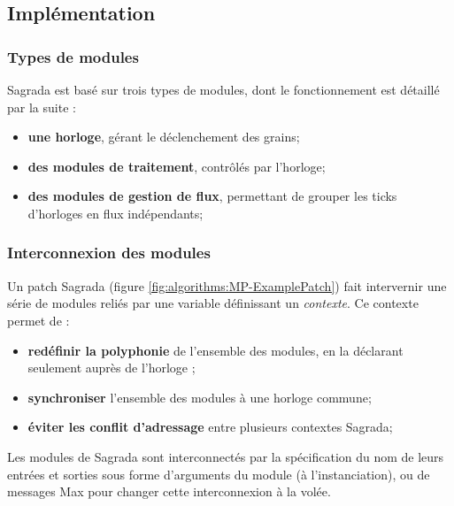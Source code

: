\subsection{Implémentation}

\subsubsection{Types de modules}
\noindent Sagrada est basé sur trois types de modules, dont le fonctionnement est détaillé par la suite :
\vspace{-1em}
\begin{itemize}[noitemsep]
	\item \textbf{une horloge}, gérant le déclenchement des grains;
	\item \textbf{des modules de traitement}, contrôlés par l'horloge;
	\item \textbf{des modules de gestion de flux}, permettant de grouper les ticks d'horloges en flux indépendants;
\end{itemize}


\subsubsection{Interconnexion des modules}

\noindent Un patch Sagrada (figure \ref{fig:algorithms:MP-ExamplePatch}) fait intervernir une série de modules reliés par une variable définissant un \textit{contexte}. Ce contexte permet de :
\vspace{-1em}
\begin{itemize}[noitemsep]
	\item \textbf{redéfinir la polyphonie} de l'ensemble des modules, en la déclarant seulement auprès de l'horloge ;
	\item \textbf{synchroniser} l'ensemble des modules à une horloge commune;
	\item \textbf{éviter les conflit d'adressage} entre plusieurs contextes Sagrada;
\end{itemize}

\noindent Les modules de Sagrada sont interconnectés par la spécification du nom de leurs entrées et sorties sous forme d'arguments du module (à l'instanciation), ou de messages Max pour changer cette interconnexion à la volée.

